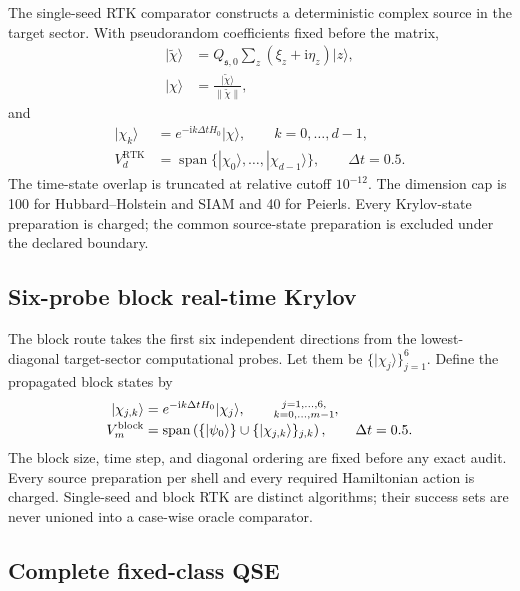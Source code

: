 \documentclass[
  reprint,
  amsmath,
  amssymb,
  aps,
  pra,
  nofootinbib,
  superscriptaddress,
  floatfix
]{revtex4-2}
\newcommand{\ii}{\mathrm{i}}
\newcommand{\ket}[1]{|#1\rangle}
\newcommand{\spanop}{\operatorname{span}}
\newcommand{\RTK}{\mathrm{RTK}}
\begin{document}
The single-seed RTK comparator constructs a deterministic complex source in
the target sector.  With pseudorandom coefficients fixed before the matrix,
\begin{align}
 \ket{\widetilde\chi}
 &=Q_{\mathfrak s,0}\sum_z(\xi_z+\ii\eta_z)\ket{z},
 \nonumber\\
 \ket{\chi}&=\frac{\ket{\widetilde\chi}}
 {\|\widetilde\chi\|},
 \label{eq:single_rtk_source}
\end{align}
and
\begin{align}
 \ket{\chi_k}&=e^{-\ii k\Delta tH_0}\ket{\chi},
 \qquad k=0,\ldots,d-1,
 \nonumber\\
 V_d^{\RTK}&=\spanop\{\ket{\chi_0},\ldots,\ket{\chi_{d-1}}\},
 \qquad \Delta t=0.5.
 \label{eq:single_rtk_space}
\end{align}
The time-state overlap is truncated at relative cutoff $10^{-12}$.  The
dimension cap is 100 for Hubbard--Holstein and SIAM and 40 for Peierls.
Every Krylov-state preparation is charged; the common source-state
preparation is excluded under the declared boundary.

\subsection{Six-probe block real-time Krylov}
\label{sec:block_rtk}

The block route takes the first six independent directions from the
lowest-diagonal target-sector computational probes.  Let them be
$\{\ket{\chi_j}\}_{j=1}^{6}$.  Define the propagated block states by
\begin{align}
 \ket{\chi_{j,k}}
 &=e^{-\ii k\Delta tH_0}\ket{\chi_j},
 \qquad
 \substack{j=1,\ldots,6,\\ k=0,\ldots,m-1},
 \nonumber\\[-0.5ex]
 V_m^{\rm block}
 &=\spanop\left(
 \{\ket{\psi_0}\}\cup
 \{\ket{\chi_{j,k}}\}_{j,k}
 \right),
 \qquad \Delta t=0.5.
 \label{eq:block_rtk_space}
\end{align}
The block size, time step, and diagonal ordering are fixed before any exact
audit.  Every source preparation per shell and every required Hamiltonian
action is charged.  Single-seed and block RTK are distinct algorithms; their
success sets are never unioned into a case-wise oracle comparator.

\subsection{Complete fixed-class QSE}
\label{sec:fixed_qse}
\end{document}
